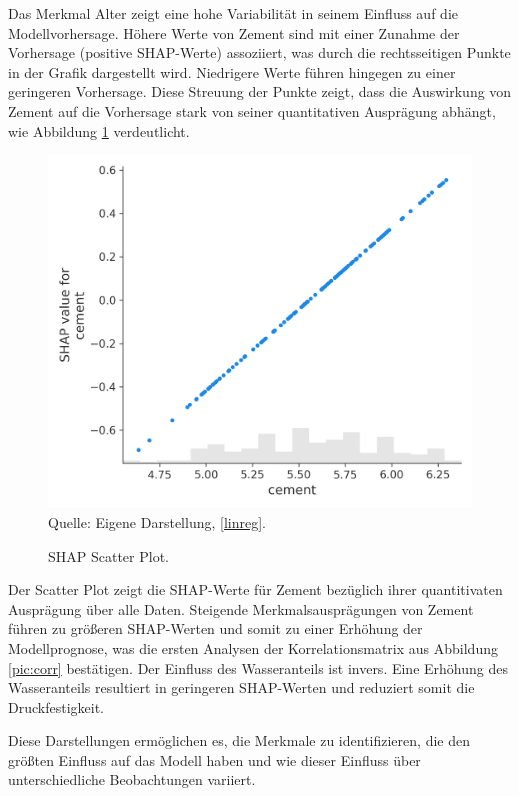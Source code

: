 Das Merkmal Alter zeigt eine hohe Variabilität in seinem Einfluss auf die Modellvorhersage. 
Höhere Werte von Zement sind mit einer Zunahme der Vorhersage (positive SHAP-Werte) assoziiert, 
was durch die rechtsseitigen Punkte in der Grafik dargestellt wird. 
Niedrigere Werte führen hingegen zu einer geringeren Vorhersage. Diese Streuung der Punkte zeigt, 
dass die Auswirkung von Zement auf die Vorhersage stark von seiner quantitativen Ausprägung abhängt, 
wie Abbildung \ref{pic:shap_scatter} verdeutlicht. 

\begin{figure}[!h]
    \caption{SHAP Scatter Plot.}
    \includegraphics[width=1\textwidth]{../scripts/images/shap_scatter_plot.png}
    Quelle: Eigene Darstellung, \ref{linreg}.
    \label{pic:shap_scatter}
\end{figure}

Der Scatter Plot zeigt die SHAP-Werte für Zement bezüglich ihrer quantitivaten Ausprägung über alle 
Daten. Steigende Merkmalsausprägungen von Zement führen zu größeren SHAP-Werten und somit zu einer Erhöhung der 
Modellprognose, was die ersten Analysen der Korrelationsmatrix aus Abbildung \ref{pic:corr} bestätigen. Der Einfluss des Wasseranteils
ist invers. Eine Erhöhung des Wasseranteils resultiert in geringeren SHAP-Werten und reduziert somit die 
Druckfestigkeit. 

Diese Darstellungen ermöglichen es, die Merkmale zu identifizieren, 
die den größten Einfluss auf das Modell haben und wie dieser Einfluss über 
unterschiedliche Beobachtungen variiert.

